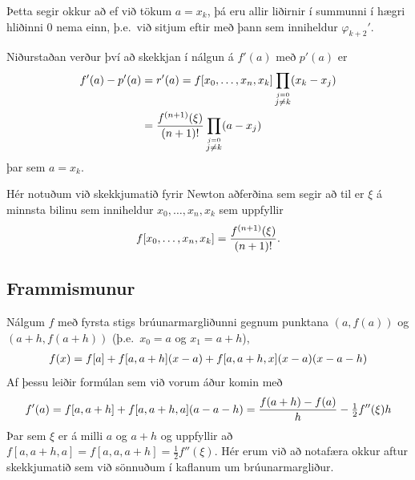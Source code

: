 \documentclass[letterpaper,10pt,icelandic]{sphinxmanual}
\begin{document}
Þetta segir okkur að ef við tökum \(a=x_k\), þá eru allir liðirnir í
summunni í hægri hliðinni \(0\) nema einn, þ.e. við sitjum eftir með
þann sem inniheldur \({\varphi}_{k+2}'\).

Niðurstaðan verður því að skekkjan í nálgun á \(f'(a)\) með
\(p'(a)\) er
\begin{gather}
\begin{split}\begin{aligned}
  f'(a) - p'(a) &= r'(a)
=f[x_0,\dots,x_n,x_k]
\prod_{\stackrel{j=0}{j \not= k}} (x_k-x_j)\\
&=\dfrac{f^{(n+1)}(\xi)}{(n+1)!}
  \prod_{\stackrel{j=0}{j \not= k}} (a-x_j)\end{aligned}\end{split}\notag
\end{gather}
þar sem \(a=x_k\).

Hér notuðum við skekkjumatið fyrir Newton aðferðina sem
segir að til er \(\xi\) á minnsta bilinu sem inniheldur
\(x_0,\ldots,x_n,x_k\) sem uppfyllir
\begin{gather}
\begin{split}f[x_0,\ldots,x_n,x_k] = \frac{f^{(n+1)}(\xi)}{(n+1)!}.\end{split}\notag
\end{gather}

\subsection{Frammismunur}
\label{kafli04:id2}
Nálgum \(f\) með fyrsta stigs brúunarmargliðunni gegnum punktana
\((a,f(a))\) og \((a+h,f(a+h))\) (þ.e. \(x_0 = a\) og
\(x_1 = a+h\)),
\begin{gather}
\begin{split}f(x)=f[a]+f[a,a+h](x-a)+f[a,a+h,x](x-a)(x-a-h)\end{split}\notag
\end{gather}
Af þessu leiðir formúlan sem við vorum áður komin með
\begin{gather}
\begin{split}f'(a)=f[a,a+h]+f[a,a+h,a](a-a-h)
  =\dfrac{f(a+h)-f(a)}h-\tfrac 12 f''(\xi)h\end{split}\notag
\end{gather}
Þar sem \(\xi\) er á milli \(a\) og \(a+h\) og uppfyllir að
\(f[a,a+h,a]=f[a,a,a+h]=\tfrac 12f''(\xi)\). Hér erum við að
notafæra okkur aftur skekkjumatið sem við sönnuðum í kaflanum um
brúunarmargliður.
\end{document}
